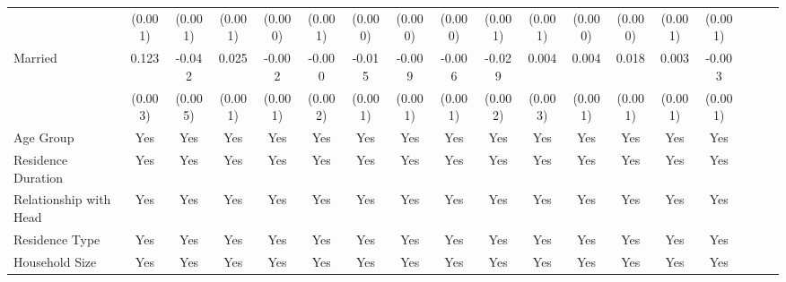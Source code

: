 \documentclass[a4paper,12pt]{article}
\begin{document}
\begin{table}[htbp]
{\begin{tabular}{@{}l*{17}{c}@{}}
          &  (0.001)         &  (0.001)         &  (0.001)         &  (0.000)         &  (0.001)         &  (0.000)         &  (0.000)         &  (0.000)         &  (0.001)         &  (0.001)         &  (0.000)         &  (0.000)         &  (0.001)         &  (0.001)         \\
\addlinespace
Married   &    0.123\sym{***}&   -0.042\sym{***}&    0.025\sym{***}&   -0.002\sym{***}&   -0.000         &   -0.015\sym{***}&   -0.009\sym{***}&   -0.006\sym{***}&   -0.029\sym{***}&    0.004         &    0.004\sym{***}&    0.018\sym{***}&    0.003\sym{***}&   -0.003\sym{**} \\
          &  (0.003)         &  (0.005)         &  (0.001)         &  (0.001)         &  (0.002)         &  (0.001)         &  (0.001)         &  (0.001)         &  (0.002)         &  (0.003)         &  (0.001)         &  (0.001)         &  (0.001)         &  (0.001)         \\
\addlinespace
Age Group &      Yes         &      Yes         &      Yes         &      Yes         &      Yes         &      Yes         &      Yes         &      Yes         &      Yes         &      Yes         &      Yes         &      Yes         &      Yes         &      Yes         \\
\addlinespace
Residence Duration &      Yes         &      Yes         &      Yes         &      Yes         &      Yes         &      Yes         &      Yes         &      Yes         &      Yes         &      Yes         &      Yes         &      Yes         &      Yes         &      Yes         \\
\addlinespace
Relationship with Head &      Yes         &      Yes         &      Yes         &      Yes         &      Yes         &      Yes         &      Yes         &      Yes         &      Yes         &      Yes         &      Yes         &      Yes         &      Yes         &      Yes         \\
\addlinespace
Residence Type &      Yes         &      Yes         &      Yes         &      Yes         &      Yes         &      Yes         &      Yes         &      Yes         &      Yes         &      Yes         &      Yes         &      Yes         &      Yes         &      Yes         \\
\addlinespace
Household Size &      Yes         &      Yes         &      Yes         &      Yes         &      Yes         &      Yes         &      Yes         &      Yes         &      Yes         &      Yes         &      Yes         &      Yes         &      Yes         &      Yes         \\

\end{tabular}}
\end{table}
\end{document}

